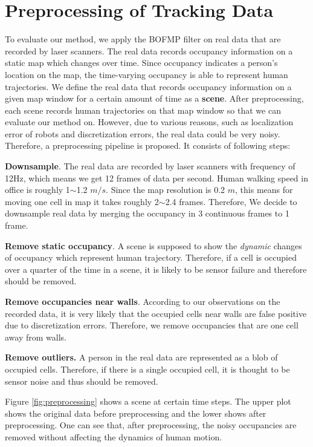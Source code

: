 \newpage
\section{Preprocessing of Tracking Data}

To evaluate our method, we apply the BOFMP filter on real data that are recorded by laser scanners. The real data records occupancy information on a static map which changes over time. Since occupancy indicates a person's location on the map, the time-varying occupancy is able to represent human trajectories. We define the real data that records occupancy information on a given map window for a certain amount of time as a \textbf{scene}. After preprocessing, each scene records human trajectories on that map window so that we can evaluate our method on. However, due to various reasons, such as localization error of robots and discretization errors, the real data could be very noisy. Therefore, a preprocessing pipeline is proposed. It consists of following steps:

\begin{my_enumerate}
\item \textbf{Downsample}. The real data are recorded by laser scanners with frequency of 12Hz, which means we get 12 frames of data per second. Human walking speed in office is roughly 1$\sim$1.2 $m/s$. Since the map resolution is 0.2 $m$, this means for moving one cell in map it takes roughly 2$\sim$2.4 frames. Therefore, We decide to downsample real data by merging the occupancy in 3 continuous frames to 1 frame.
\item \textbf{Remove static occupancy}. A scene is supposed to show the \textit{dynamic} changes of occupancy which represent human trajectory. Therefore, if a cell is occupied over a quarter of the time in a scene, it is likely to be sensor failure and therefore should be removed. 
\item \textbf{Remove occupancies near walls}. According to our observations on the recorded data, it is very likely that the occupied cells near walls are false positive due to discretization errors. Therefore, we remove occupancies that are one cell away from walls. 
\item \textbf{Remove outliers.} A person in the real data are represented as a blob of occupied cells. Therefore, if there is a single occupied cell, it is thought to be sensor noise and thus should be removed.
\end{my_enumerate}

Figure \ref{fig:preprocessing} shows a scene at certain time steps. The upper plot shows the original data before preprocessing and the lower shows after preprocessing. One can see that, after preprocessing, the noisy occupancies are removed without affecting the dynamics of human motion.

